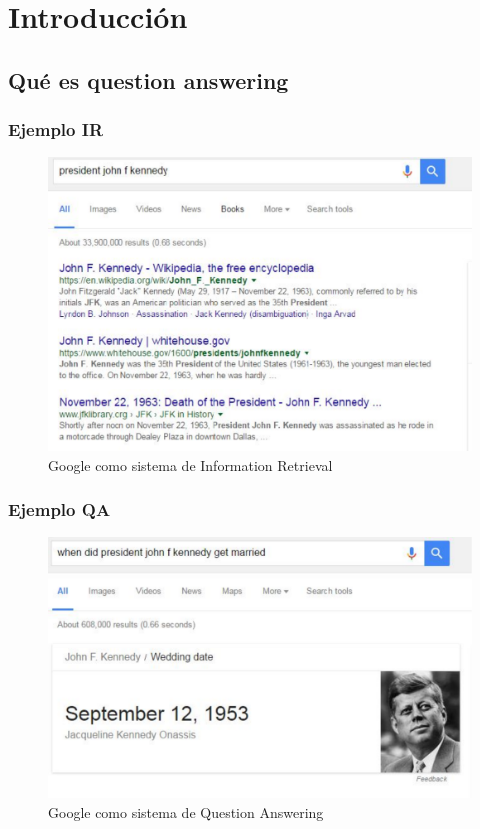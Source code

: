 \section{Introducción}

\subsection{Qué es question answering}

\begin{frame}
\frametitle{Ejemplo IR}
\begin{figure}
  \centering
    \includegraphics[scale=.35]{graficos/i-r-example}
  \caption{Google como sistema de Information Retrieval}
  \label{fig:qa-example}
\end{figure}
\end{frame}


\begin{frame}
\frametitle{Ejemplo QA}
\begin{figure}
  \centering
    \includegraphics[scale=.5]{graficos/q-a-example}
  \caption{Google como sistema de Question Answering}
  \label{fig:qa-example}
\end{figure}
\end{frame}


